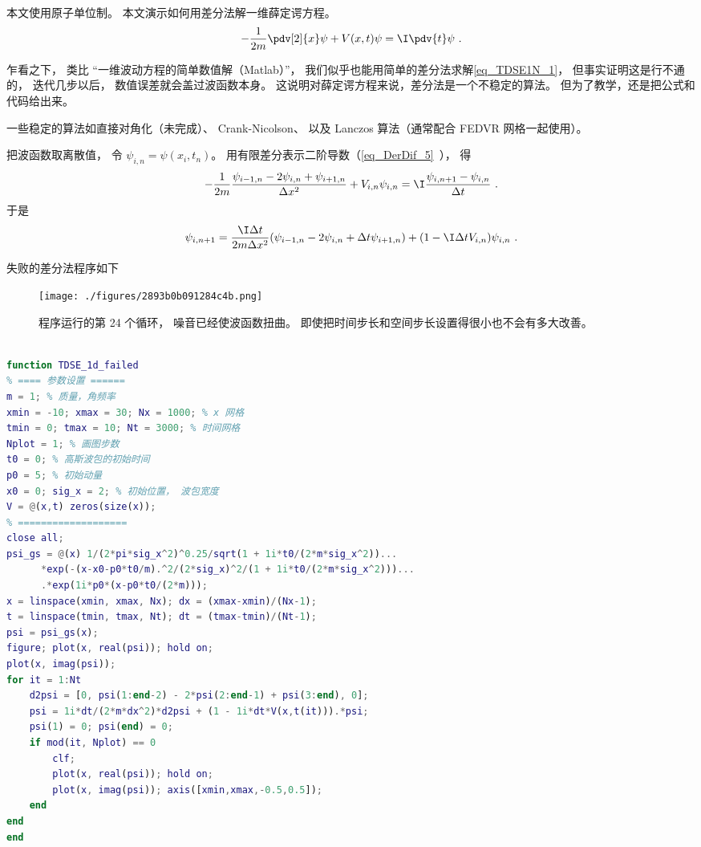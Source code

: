 

本文使用原子单位制。 本文演示如何用差分法解一维薛定谔方程。
\begin{equation}\label{eq_TDSE1N_1}
-\frac{1}{2m}\pdv[2]{x}\psi + V(x,t)\psi = \I\pdv{t}\psi~.
\end{equation}

乍看之下， 类比 “一维波动方程的简单数值解（Matlab）”， 我们似乎也能用简单的差分法求解\autoref{eq_TDSE1N_1}， 但事实证明这是行不通的， 迭代几步以后， 数值误差就会盖过波函数本身。 这说明对薛定谔方程来说，差分法是一个不稳定的算法。 但为了教学，还是把公式和代码给出来。

一些稳定的算法如直接对角化（未完成）、 Crank-Nicolson、 以及 Lanczos 算法（通常配合 FEDVR 网格一起使用）。

把波函数取离散值， 令 $\psi_{i,n} = \psi(x_i,t_n)$。 用有限差分表示二阶导数（\autoref{eq_DerDif_5}~）， 得
\begin{equation}
-\frac{1}{2m}\frac{\psi_{i-1,n} - 2\psi_{i,n} + \psi_{i+1,n}}{\Delta x^2} + V_{i,n}\psi_{i,n} = \I \frac{\psi_{i, n+1} - \psi_{i, n}}{\Delta t}~.
\end{equation}
于是
\begin{equation}
\psi_{i, n+1} = \frac{\I\Delta t}{2m\Delta x^2} (\psi_{i-1,n} - 2\psi_{i,n} + \Delta t\psi_{i+1,n}) + (1-\I \Delta t V_{i,n})\psi_{i,n}~.
\end{equation}

失败的差分法程序如下
\begin{figure}[ht]
\centering
\texttt{[image: ./figures/2893b0b091284c4b.png]}
\caption{程序运行的第 24 个循环， 噪音已经使波函数扭曲。 即使把时间步长和空间步长设置得很小也不会有多大改善。} \label{fig_TDSE1N_1}
\end{figure}

\begin{lstlisting}[language=matlab, caption=TDSE\_1d\_failed.m]
% 差分法解一维薛定谔方程

function TDSE_1d_failed
% ==== 参数设置 ======
m = 1; % 质量，角频率
xmin = -10; xmax = 30; Nx = 1000; % x 网格
tmin = 0; tmax = 10; Nt = 3000; % 时间网格
Nplot = 1; % 画图步数
t0 = 0; % 高斯波包的初始时间
p0 = 5; % 初始动量
x0 = 0; sig_x = 2; % 初始位置， 波包宽度
V = @(x,t) zeros(size(x));
% ===================
close all;
psi_gs = @(x) 1/(2*pi*sig_x^2)^0.25/sqrt(1 + 1i*t0/(2*m*sig_x^2))...
      *exp(-(x-x0-p0*t0/m).^2/(2*sig_x)^2/(1 + 1i*t0/(2*m*sig_x^2)))...
      .*exp(1i*p0*(x-p0*t0/(2*m)));
x = linspace(xmin, xmax, Nx); dx = (xmax-xmin)/(Nx-1);
t = linspace(tmin, tmax, Nt); dt = (tmax-tmin)/(Nt-1);
psi = psi_gs(x);
figure; plot(x, real(psi)); hold on;
plot(x, imag(psi));
for it = 1:Nt
    d2psi = [0, psi(1:end-2) - 2*psi(2:end-1) + psi(3:end), 0];
    psi = 1i*dt/(2*m*dx^2)*d2psi + (1 - 1i*dt*V(x,t(it))).*psi;
    psi(1) = 0; psi(end) = 0;
    if mod(it, Nplot) == 0
        clf;
        plot(x, real(psi)); hold on;
        plot(x, imag(psi)); axis([xmin,xmax,-0.5,0.5]);
    end
end
end
\end{lstlisting}
